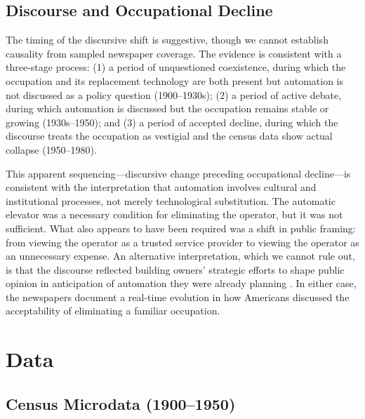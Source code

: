 \documentclass[12pt]{article}
\begin{document}
\subsection{Discourse and Occupational Decline}

The timing of the discursive shift is suggestive, though we cannot establish causality from sampled newspaper coverage. The evidence is consistent with a three-stage process: (1) a period of unquestioned coexistence, during which the occupation and its replacement technology are both present but automation is not discussed as a policy question (1900--1930s); (2) a period of active debate, during which automation is discussed but the occupation remains stable or growing (1930s--1950); and (3) a period of accepted decline, during which the discourse treats the occupation as vestigial and the census data show actual collapse (1950--1980).

This apparent sequencing---discursive change preceding occupational decline---is consistent with the interpretation that automation involves cultural and institutional processes, not merely technological substitution. The automatic elevator was a necessary condition for eliminating the operator, but it was not sufficient. What also appears to have been required was a shift in public framing: from viewing the operator as a trusted service provider to viewing the operator as an unnecessary expense. An alternative interpretation, which we cannot rule out, is that the discourse reflected building owners' strategic efforts to shape public opinion in anticipation of automation they were already planning \citep{mokyr1992}. In either case, the newspapers document a real-time evolution in how Americans discussed the acceptability of eliminating a familiar occupation.



\section{Data} \label{sec:data}

\subsection{Census Microdata (1900--1950)}
\end{document}
